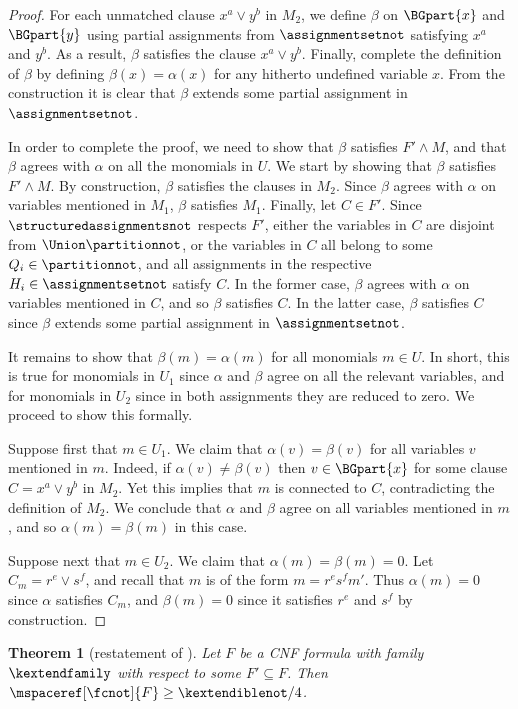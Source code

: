 \documentclass[11pt]{article}
\numberwithin{equation}{section}
\newtheorem{theorem}{Theorem}[section]
\theoremstyle{definition}
\theoremstyle{plain}
\begin{document}
\begin{proof}
For each unmatched clause $x^a \lor y^b$ in $M_2$, we define $\beta$ on $\BGpart{x}$ and $\BGpart{y}$ using partial assignments from $\assignmentsetnot$ satisfying $x^a$ and $y^b$. As a result, $\beta$ satisfies the clause $x^a \lor y^b$. Finally, complete the definition of $\beta$ by defining $\beta(x) = \alpha(x)$ for any hitherto undefined variable $x$. From the construction it is clear that $\beta$ extends some partial assignment in $\assignmentsetnot$.

In order to complete the proof, we need to show that $\beta$ satisfies $F' \land M$, and that $\beta$ agrees with $\alpha$ on all the monomials in $U$. We start by showing that $\beta$ satisfies $F' \land M$. By construction, $\beta$ satisfies the clauses in $M_2$. Since $\beta$ agrees with $\alpha$ on variables mentioned in $M_1$, $\beta$ satisfies $M_1$. Finally, let $C \in F'$. Since $\structuredassignmentsnot$ respects $F'$, either the variables in $C$ are disjoint from $\Union \partitionnot$, or the variables in $C$ all belong to some $Q_i \in \partitionnot$, and all assignments in the respective $H_i \in \assignmentsetnot$ satisfy $C$. In the former case, $\beta$ agrees with $\alpha$ on variables mentioned in $C$, and so $\beta$ satisfies $C$. In the latter case, $\beta$ satisfies $C$ since $\beta$ extends some partial assignment in $\assignmentsetnot$.

It remains to show that $\beta(m) = \alpha(m)$ for all monomials $m \in U$. In short, this is true for monomials in $U_1$ since $\alpha$ and $\beta$ agree on all the relevant variables, and for monomials in $U_2$ since in both assignments they are reduced to zero. We proceed to show this formally.

Suppose first that $m \in U_1$. We claim that $\alpha(v) = \beta(v)$ for all variables $v$ mentioned in $m$. Indeed, if $\alpha(v) \neq \beta(v)$ then $v \in \BGpart{x}$ for some clause $C = x^a \lor y^b$ in $M_2$. Yet this implies that $m$ is connected to $C$, contradicting the definition of $M_2$. We conclude that $\alpha$ and $\beta$ agree on all variables mentioned in $m$, and so $\alpha(m) = \beta(m)$ in this case.

Suppose next that $m \in U_2$. 
We claim that $\alpha(m) = \beta(m) = 0$. Let $C_m = r^e \lor s^f$,
and recall that $m$ is of the form $m = r^e s^f m'$. 
Thus $\alpha(m) = 0$ since $\alpha$ satisfies $C_m$, and $\beta(m) =0$ 
since it satisfies $r^e$ and $s^f$ by construction.
\end{proof}

\begin{theorem}[restatement of 
  \cite{BG15Framework}]
  Let $F$ be a CNF formula with \akextendible family $\kextendfamily$
  with respect to some $F'\subseteq F$. Then
  $\mspaceref[\fcnot]{F}\geq \kextendiblenot/4$.
\end{theorem}
\end{document}
